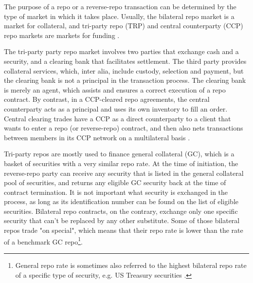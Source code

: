 \documentclass[11pt,a4paper,english,oneside]{article}
\begin{document}
The purpose of a repo or a reverse-repo transaction can be determined by the type of market in which it takes place. Usually, the bilateral repo market is a market for collateral, and tri-party repo (TRP) and central counterparty (CCP) repo markets are markets for funding \citep{singh2020}.

The tri-party party repo market involves two parties that exchange cash and a security, and a clearing bank that facilitates settlement. The third party provides collateral services, which, inter alia, include custody, selection and payment, but the clearing bank is not a principal in the transaction process. The clearing bank is merely an agent, which assists and ensures a correct execution of a repo contract. By contrast, in a CCP-cleared repo agreements, the central counterparty acts as a principal and uses its own inventory to fill an order. Central clearing trades have a CCP as a direct counterparty to a client that wants to enter a repo (or reverse-repo) contract, and then also nets transactions between members in its CCP network on a multilateral basis \citep{aguiar2016}.

Tri-party repos are mostly used to finance general collateral (GC), which is a basket of securities with a very similar repo rate. At the time of initiation, the reverse-repo party can receive any security that is listed in the general collateral pool of securities, and returns any eligible GC security back at the time of contract termination. It is not important what security is exchanged in the process, as long as its identification number can be found on the list of eligible securities. Bilateral repo contracts, on the contrary, exchange only one specific security that can't be replaced by any other substitute. Some of those bilateral repos trade "on special", which means that their repo rate is lower than the rate of a benchmark GC repo\footnote{General repo rate is sometimes also referred to the highest bilateral repo rate of a specific type of security, e.g. US Treasury securities \citep{duffie1996}.}.
\end{document}
